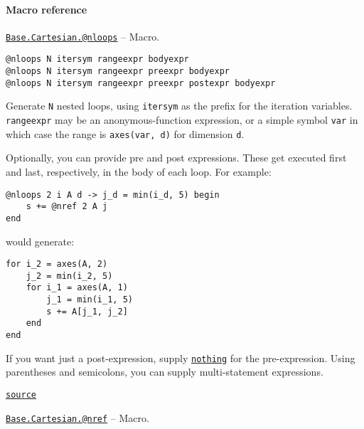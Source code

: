 \paragraph{Macro reference}


\hypertarget{4938945836201444124}{}
\hyperlink{4938945836201444124}{\texttt{Base.Cartesian.@nloops}}  -- {Macro.}

\begin{adjustwidth}{2em}{0pt}


\begin{verbatim}
@nloops N itersym rangeexpr bodyexpr
@nloops N itersym rangeexpr preexpr bodyexpr
@nloops N itersym rangeexpr preexpr postexpr bodyexpr
\end{verbatim}

Generate \texttt{N} nested loops, using \texttt{itersym} as the prefix for the iteration variables. \texttt{rangeexpr} may be an anonymous-function expression, or a simple symbol \texttt{var} in which case the range is \texttt{axes(var, d)} for dimension \texttt{d}.

Optionally, you can provide {\textquotedbl}pre{\textquotedbl} and {\textquotedbl}post{\textquotedbl} expressions. These get executed first and last, respectively, in the body of each loop. For example:


\begin{lstlisting}
@nloops 2 i A d -> j_d = min(i_d, 5) begin
    s += @nref 2 A j
end
\end{lstlisting}

would generate:


\begin{lstlisting}
for i_2 = axes(A, 2)
    j_2 = min(i_2, 5)
    for i_1 = axes(A, 1)
        j_1 = min(i_1, 5)
        s += A[j_1, j_2]
    end
end
\end{lstlisting}

If you want just a post-expression, supply \hyperlink{9331422207248206047}{\texttt{nothing}} for the pre-expression. Using parentheses and semicolons, you can supply multi-statement expressions.



\href{https://github.com/JuliaLang/julia/blob/9058264a69f9efc1af805c4473c946f87859b731/base/cartesian.jl#L9-L37}{\texttt{source}}


\end{adjustwidth}
\hypertarget{5318613607184308860}{}
\hyperlink{5318613607184308860}{\texttt{Base.Cartesian.@nref}}  -- {Macro.}

